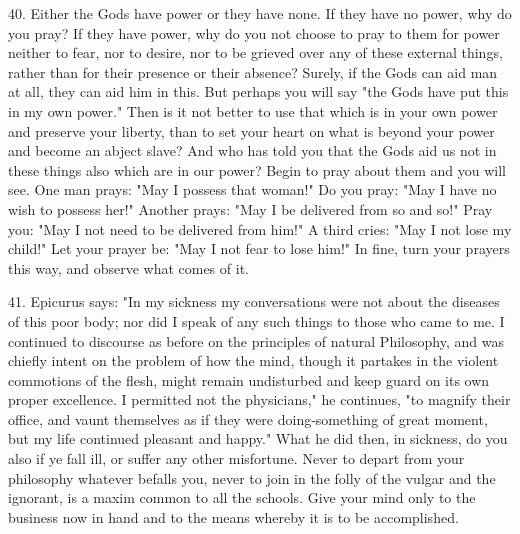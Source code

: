 \documentclass{book}
\begin{document}
40. Either the Gods have power or they have none. If they have no
power, why do you pray? If they have power, why do you not choose to
pray to them for power neither to fear, nor to desire, nor to be
grieved over any of these external things, rather than for their
presence or their absence? Surely, if the Gods can aid man at all,
they can aid him in this. But perhaps you will say "the Gods have put
this in my own power." Then is it not better to use that which is in
your own power and preserve your liberty, than to set your heart on
what is beyond your power and become an abject slave? And who has told
you that the Gods aid us not in these things also which are in our
power? Begin to pray about them and you will see. One man prays: "May
I possess that woman!" Do you pray: "May I have no wish to possess
her!" Another prays: "May I be delivered from so and so!" Pray you:
"May I not need to be delivered from him!" A third cries: "May I not
lose my child!"  Let your prayer be: "May I not fear to lose him!" In
fine, turn your prayers this way, and observe what comes of it.

41. Epicurus says: "In my sickness my conversations were not about the
diseases of this poor body; nor did I speak of any such things to
those who came to me. I continued to discourse as before on the
principles of natural Philosophy, and was chiefly intent on the
problem of how the mind, though it partakes in the violent commotions
of the flesh, might remain undisturbed and keep guard on its own
proper excellence. I permitted not the physicians," he continues, "to
magnify their office, and vaunt themselves as if they were
doing-something of great moment, but my life continued pleasant and
happy." What he did then, in sickness, do you also if ye fall ill, or
suffer any other misfortune. Never to depart from your philosophy
whatever befalls you, never to join in the folly of the vulgar and the
ignorant, is a maxim common to all the schools. Give your mind only to
the business now in hand and to the means whereby it is to be
accomplished.
\end{document}
